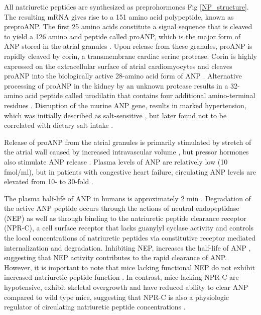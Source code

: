 \documentclass[14pt,a4paper,onecolumn]{extarticle}
\begin{document}
All natriuretic peptides are synthesized as preprohormones Fig \ref{NP_structure}.
The resulting mRNA gives rise to a 151 amino acid polypeptide, known as preproANP. The first 25 amino acids constitute a signal sequence that is cleaved to yield a 126 amino acid peptide called proANP, which is the major form of ANP stored in the atrial granules \citep{Oikawa1984}.
Upon release from these granules, proANP is rapidly cleaved by corin, a transmembrane cardiac serine protease. Corin is highly expressed on the extracellular surface of atrial cardiomyocytes and cleaves proANP into the biologically active 28-amino acid form of ANP \citep{Yan2000}.
Alternative processing of proANP in the kidney by an unknown protease results in a 32-amino acid peptide called urodilatin that contains four additional amino-terminal residues \citep{Forssmann1998}.
Disruption of the murine ANP gene, results in marked hypertension, which was initially described as salt-sensitive \citep{John1995}, but later found not to be correlated with dietary salt intake \citep{John1996}.

Release of proANP from the atrial granules is primarily stimulated by stretch of the atrial wall caused by increased intravascular volume \citep{Bilder1986} \citep{Edwards1988} \citep{Lang1985}, but pressor hormones also stimulate ANP release \citep{Ruskoaho2003}.
Plasma levels of ANP are relatively low (10 fmol/ml), but in patients with congestive heart failure, circulating ANP levels are elevated from 10- to 30-fold \citep{Burnett1986} \citep{Cody1986}.

The plasma half-life of ANP in humans is approximately 2 min \citep{Nakao1986} \citep{Yandle1986}.
Degradation of the active ANP peptide occurs through the actions of neutral endopeptidase (NEP) \citep{Stephenson1987} \citep{Vanneste1988} as well as through binding to the natriuretic peptide clearance receptor (NPR-C), a cell surface receptor that lacks guanylyl cyclase activity and controls the local concentrations of natriuretic peptides via constitutive receptor mediated internalization and degradation. Inhibiting NEP, increases the half-life of ANP \citep{Yandle1989},
suggesting that NEP activity contributes to the rapid clearance of ANP. However, it is important to note that mice lacking functional NEP do not exhibit increased natriuretic peptide function \citep{Lu1995}.
In contrast, mice lacking NPR-C are hypotensive, exhibit skeletal overgrowth and have reduced ability to clear ANP compared to wild type mice, suggesting that NPR-C is also a physiologic regulator of circulating natriuretic peptide concentrations \citep{Matsukawa1999}.
\end{document}
